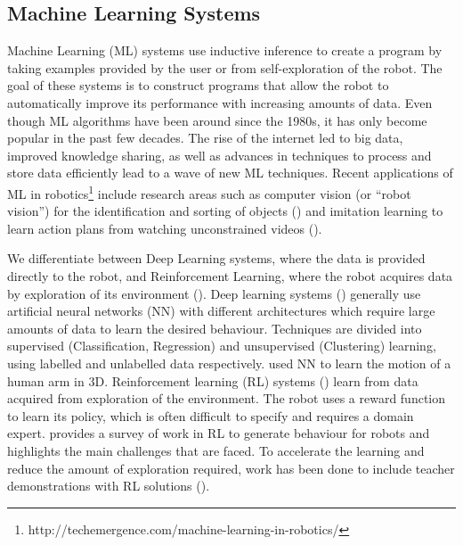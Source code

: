 \subsection{Machine Learning Systems}\label{sssec:Learning Systems}
Machine Learning (ML) systems use inductive inference to create a program by taking examples provided by the user or from self-exploration of the robot. 
The goal of these systems is to construct programs that allow the robot to automatically improve its performance with increasing amounts of data. 
Even though ML algorithms have been around since the 1980s, it has only become popular in the past few decades. 
The rise of the internet led to big data, improved knowledge sharing, as well as advances in techniques to process and store data efficiently lead to a wave of new ML techniques.
Recent applications of ML in robotics\footnote{http://techemergence.com/machine-learning-in-robotics/} include research areas such as computer vision (or ``robot vision'') for the identification and sorting of objects (\cite{stager2013computer}) and imitation learning to learn action plans from watching unconstrained videos (\cite{Yang2015}).

We differentiate between Deep Learning systems, where the data is provided directly to the robot, and Reinforcement Learning, where the robot acquires data by exploration of its environment ().
Deep learning systems (\cite{schmidhuber2015deep}) generally use artificial neural networks (NN) with different architectures which require large amounts of data to learn the desired behaviour.
Techniques are divided into supervised (\eg Classification, Regression) and unsupervised (\eg Clustering) learning, using labelled and unlabelled data respectively.
\cite{billard2001robust} used NN to learn the motion of a human arm in 3D.
Reinforcement learning (RL) systems (\cite{sutton1998reinforcement,kaelbling1996reinforcement,gosavi2009reinforcement}) learn from data acquired from exploration of the environment. 
The robot uses a reward function to learn its policy, which is often difficult to specify and requires a domain expert.
\cite{kober2013reinforcement} provides a survey of work in RL to generate behaviour for robots and highlights the main challenges that are faced.
To accelerate the learning and reduce the amount of exploration required, work has been done to include teacher demonstrations with RL solutions (\cite{martinez2017relational,hester2017learning}).


